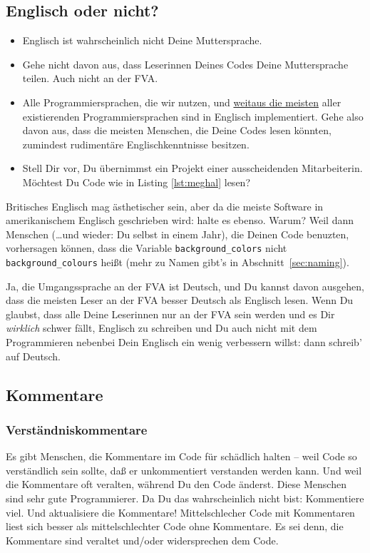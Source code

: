 \documentclass[twoside]{scrartcl}
\providecommand{\code}[1]{\texttt{#1}}
\begin{document}
\subsection{Englisch oder nicht?}
\begin{itemize}
\item Englisch ist wahrscheinlich nicht Deine Muttersprache.
\end{itemize}
\begin{itemize}
\item Gehe nicht davon aus, dass Leserinnen Deines Codes Deine
  Muttersprache teilen. Auch nicht an der FVA.
\item Alle Programmiersprachen, die wir nutzen, und
  \href{http://en.wikipedia.org/wiki/Non-English-based_programming_languages}
  {weitaus die meisten}
  aller existierenden Programmiersprachen sind in Englisch implementiert.
  Gehe also davon aus, dass die meisten Menschen, die Deine Codes lesen
  k\"o{}nnten, zumindest rudiment\"a{}re Englischkenntnisse besitzen.
\item Stell Dir vor, Du \"u{}bernimmst ein Projekt einer ausscheidenden
  Mitarbeiterin. M\"o{}chtest Du Code wie in Listing \ref{lst:meghal}
  lesen?
\end{itemize}


 Britisches Englisch mag \"a{}sthetischer sein,
aber da die meiste Software in amerikanischem Englisch geschrieben wird: halte
es ebenso. Warum? Weil dann Menschen (\ldots und wieder: Du selbst in einem
Jahr), die Deinen Code benuzten, vorhersagen k\"o{}nnen, dass die Variable
\code{background\_colors} nicht \code{background\_colours} hei\ss{}t (mehr zu
Namen gibt's in Abschnitt~\ref{sec:naming}). 

 Ja, die Umgangssprache an der FVA ist Deutsch, und Du
kannst davon ausgehen, dass die meisten Leser an der FVA besser Deutsch als
Englisch lesen. Wenn Du glaubst, dass alle Deine Leserinnen nur an der FVA
sein werden und es Dir \emph{wirklich} schwer f\"a{}llt, Englisch zu schreiben
und Du auch nicht mit dem Programmieren nebenbei Dein Englisch ein wenig
verbessern willst: dann schreib' auf Deutsch.

\subsection{Kommentare}
\subsubsection{Verst\"a{}ndniskommentare}
Es gibt Menschen, die Kommentare im Code f\"u{}r sch\"a{}dlich halten -- weil 
Code so verst\"a{}ndlich sein sollte, da\ss{} er unkommentiert verstanden
werden kann.
Und weil die Kommentare oft veralten, w\"a{}hrend Du den Code \"a{}nderst.
Diese Menschen sind sehr gute Programmierer.
Da Du das wahrscheinlich nicht bist:
Kommentiere viel. Und aktualisiere die Kommentare! 
Mittelschlecher Code mit Kommentaren liest sich besser als mittelschlechter  
Code ohne Kommentare. Es sei denn, die Kommentare sind veraltet und/oder 
widersprechen dem Code.
\end{document}
